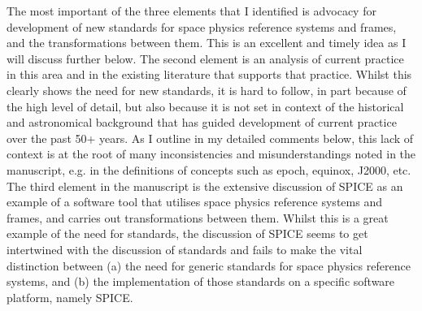\documentclass[11pt]{article}
\begin{document}
The most important of the three elements that I identified is advocacy for development of new standards for
space physics reference systems and frames, and the transformations between them. This is an excellent
and timely idea as I will discuss further below. The second element is an analysis of current practice in this
area and in the existing literature that supports that practice. Whilst this clearly shows the need for new
standards, it is hard to follow, in part because of the high level of detail, but also because it is not set in
context of the historical and astronomical background that has guided development of current practice over
the past 50+ years. As I outline in my detailed comments below, this lack of context is at the root of many
inconsistencies and misunderstandings noted in the manuscript, e.g. in the definitions of concepts such as
epoch, equinox, J2000, etc. The third element in the manuscript is the extensive discussion of SPICE as an
example of a software tool that utilises space physics reference systems and frames, and carries out
transformations between them. Whilst this is a great example of the need for standards, the discussion of
SPICE seems to get intertwined with the discussion of standards and fails to make the vital distinction
between (a) the need for generic standards for space physics reference systems, and (b) the implementation
of those standards on a specific software platform, namely SPICE.
\end{document}
